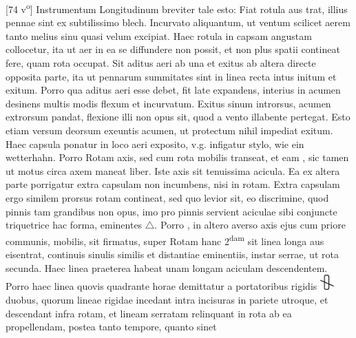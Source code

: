       [74 v\textsuperscript{o}] Instrumentum Longitudinum\protect{} breviter tale esto: Fiat rotula aus trat, illius pennae sint ex subtilissimo blech. Incurvato aliquantum, ut ventum scilicet aerem tanto melius sinu quasi velum excipiat. Haec rotula in capsam angustam collocetur, ita ut aer in ea se diffundere non possit, et non plus spatii contineat fere, quam rota occupat. Sit aditus aeri ab una et exitus ab altera directe opposita parte, ita ut pennarum summitates sint in linea recta intus initum et exitum. Porro qua aditus aeri esse debet, fit  late expandens, interius in acumen desinens multis modis flexum et incurvatum. Exitus sinum introrsus, acumen extrorsum pandat, flexione illi non opus  sit, quod a vento illabente pertegat. Esto etiam versum deorsum exeuntis acumen, ut protectum nihil impediat exitum. Haec capsula ponatur in loco aeri exposito, v.g. infigatur stylo, wie ein wetterhahn. Porro Rotam\protect{} axis, sed cum rota\protect{} mobilis transeat, et eam , sic tamen ut motus circa axem maneat liber. Iste axis sit tenuissima acicula. Ea ex altera parte porrigatur extra capsulam non incumbens, nisi in  rotam. Extra capsulam ergo similem prorsus rotam\protect{} contineat, sed quo levior sit, eo discrimine, quod pinnis tam grandibus non opus, imo pro pinnis servient aciculae sibi conjuncte triquetrice hac forma, eminentes $\bigtriangleup$. Porro , in altero averso axis ejus cum priore communis, mobilis, sit firmatus, super Rotam hanc 2\textsuperscript{dam} sit linea longa aus eisentrat, continuis sinulis similis et distantiae eminentiis, instar serrae, ut rota\protect{} secunda. Haec linea praeterea habeat unam longam aciculam descendentem. Porro haec linea quovis quadrante horae demittatur a portatoribus rigidis \protect\includegraphics[width=0.04\textwidth]{images/74vIL} duobus, quorum lineae rigidae incedant intra incisuras in pariete utroque, et descendant infra rotam\protect{}, et lineam serratam relinquant in rota\protect{} ab ea propellendam, postea tanto tempore, quanto sinet 